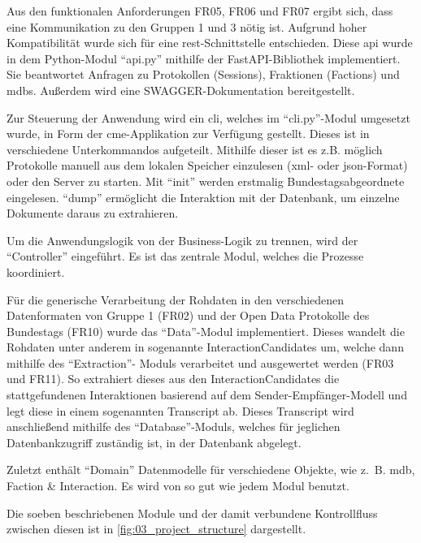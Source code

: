 Aus den funktionalen Anforderungen FR05, FR06 und FR07 ergibt sich, dass eine
Kommunikation zu den Gruppen 1 und 3 nötig ist. Aufgrund hoher Kompatibilität
wurde sich für eine \gls{rest}-Schnittstelle entschieden. Diese \gls{api} wurde in dem
Python-Modul \enquote{api.py} mithilfe der FastAPI-Bibliothek implementiert. Sie
beantwortet Anfragen zu Protokollen (Sessions), Fraktionen (Factions) und
\glspl{mdb}. Außerdem wird eine SWAGGER-Dokumentation
bereitgestellt.

Zur Steuerung der Anwendung wird ein \gls{cli}, welches im \enquote{cli.py}-Modul umgesetzt
wurde, in Form der \gls{cme}-Applikation zur Verfügung gestellt. Dieses ist in
verschiedene Unterkommandos aufgeteilt. Mithilfe dieser ist es z.B. möglich
Protokolle manuell aus dem lokalen Speicher einzulesen (\gls{xml}- oder \gls{json}-Format)
oder den Server zu starten. Mit \enquote{init} werden erstmalig Bundestagsabgeordnete
eingelesen. \enquote{dump} ermöglicht die Interaktion mit der Datenbank, um einzelne
Dokumente daraus zu extrahieren.

Um die Anwendungslogik von der Business-Logik zu trennen, wird der \enquote{Controller}
eingeführt. Es ist das zentrale Modul, welches die Prozesse koordiniert.

Für die generische Verarbeitung der Rohdaten in den verschiedenen Datenformaten
von Gruppe 1 (FR02) und der Open Data Protokolle des Bundestags (FR10) wurde
das \enquote{Data}-Modul implementiert. Dieses wandelt die Rohdaten unter anderem in
sogenannte InteractionCandidates um, welche dann mithilfe des \enquote{Extraction}-
Moduls verarbeitet und ausgewertet werden (FR03 und FR11). So extrahiert dieses
aus den InteractionCandidates die stattgefundenen Interaktionen basierend auf
dem Sender-Empfänger-Modell und legt diese in einem sogenannten Transcript ab.
Dieses Transcript wird anschließend mithilfe des \enquote{Database}-Moduls, welches für
jeglichen Datenbankzugriff zuständig ist, in der Datenbank abgelegt.

Zuletzt enthält \enquote{Domain} Datenmodelle für verschiedene Objekte, wie z.~B. \gls{mdb},
Faction \& Interaction. Es wird von so gut wie jedem Modul benutzt.

Die soeben beschriebenen Module und der damit verbundene Kontrollfluss zwischen
diesen ist in \autoref{fig:03_project_structure} dargestellt.

